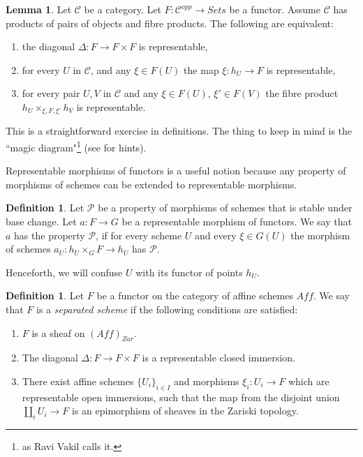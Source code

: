 \documentclass[11pt]{amsart}
\theoremstyle{definition}
\newtheorem{lemma}[theorem]{Lemma}
\newtheorem{definition}[theorem]{Definition}
\begin{document}
\begin{lemma}
	\label{lemma-representable-diagonal}
	Let $\mathcal{C}$ be a category.
	Let $F : \mathcal{C}^{opp} \to \textit{Sets}$ be a functor.
	Assume $\mathcal{C}$ has products of pairs of objects and fibre products.
	The following are equivalent:
	\begin{enumerate}
		\item the diagonal $\Delta : F \to F \times F$ is representable,
		\item for every $U$ in $\mathcal{C}$,
		and any $\xi \in F(U)$ the map $\xi : h_U \to F$ is representable,
		\item for every pair $U, V$ in $\mathcal{C}$
		and any $\xi \in F(U)$, $\xi' \in F(V)$ the fibre product
		$h_U \times_{\xi, F, \xi'} h_V$ is representable.
	\end{enumerate}
\end{lemma}
This is a straightforward exercise in definitions. The thing to keep in mind is the ``magic diagram"\footnote{as Ravi Vakil calls it.} (see \cite[Tag 0024]{stacks-project} for hints).

Representable morphisms of functors is a useful notion because any property of morphisms of schemes can be extended to representable morphisms.

\begin{definition}
	Let $\mathcal{P}$ be a property of morphisms of schemes that is stable under base change. Let $a: F\rightarrow G$ be a representable morphism of functors. We say that $a$ has the property $\mathcal{P}$, if for every scheme $U$ and every $\xi\in G(U)$ the morphism of schemes $a_U: h_U\times_G F\rightarrow h_U$ has $\mathcal{P}$. 
\end{definition}

Henceforth, we will confuse $U$ with its functor of points $h_U$.

\begin{definition}\label{separated-scheme}
	Let $F$ be a functor on the category of affine schemes $\mathit{Aff}$. We say that $F$ is a \textit{separated scheme} if the following conditions are satisfied:
	\begin{enumerate}
		\item $F$ is a sheaf on $(\mathit{Aff})_{\textit{Zar}}$.
		\item The diagonal $\Delta: F\rightarrow F\times F$ is a representable closed immersion.
		\item There exist affine schemes $\{U_i\}_{i\in I}$ and morphisms $\xi_i: U_i\rightarrow F$ which are representable open immersions, such that the map from the disjoint union $\amalg_i U_i\rightarrow F$ is an epimorphism of sheaves in the Zariski topology.
	\end{enumerate}
\end{definition}
\end{document}
